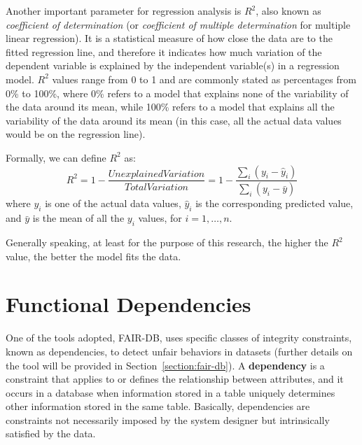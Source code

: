 Another important parameter for regression analysis is \(R^2\), also known as \textit{coefficient of determination} (or \textit{coefficient of multiple determination} for multiple linear regression). It is a statistical measure of how close the data are to the fitted regression line, and therefore it indicates how much variation of the dependent variable is explained by the independent variable(s) in a regression model. \(R^2\) values range from 0 to 1 and are commonly stated as percentages from 0\% to 100\%, where 0\% refers to a model that explains none of the variability of the data around its mean, while 100\% refers to a model that explains all the variability of the data around its mean (in this case, all the actual data values would be on the regression line).

Formally, we can define \(R^2\) as: \[R^2 = 1 - \frac{\mathit{Unexplained Variation}}{\mathit{Total Variation}} = 1 - \frac{\sum_{i}(y_i - \hat{y}_i)}{\sum_{i}(y_i - \bar{y})}\] where \(y_i\) is one of the actual data values, \(\hat{y}_i\) is the corresponding predicted value, and \(\bar{y}\) is the mean of all the \(y_i\) values, for \(i = 1, \ldots, n\).

Generally speaking, at least for the purpose of this research, the higher the \(R^2\) value, the better the model fits the data.


\section{Functional Dependencies}
\label{section:functional_dependencies}
One of the tools adopted, FAIR-DB, uses specific classes of integrity constraints, known as dependencies, to detect unfair behaviors in datasets (further details on the tool will be provided in Section~\ref{section:fair-db}). A \textbf{dependency} is a constraint that applies to or defines the relationship between attributes, and it occurs in a database when information stored in a table uniquely determines other information stored in the same table. Basically, dependencies are constraints not necessarily imposed by the system designer but intrinsically satisfied by the data.

